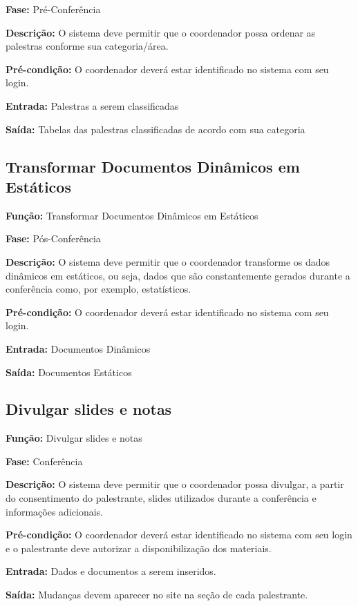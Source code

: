 \documentclass[letter]{article}
\begin{document}
\textbf{Fase:}  Pré-Conferência

\textbf{Descrição:}  O sistema deve permitir que o coordenador possa ordenar as palestras conforme sua categoria/área.

\textbf{Pré-condição:}  O coordenador deverá estar identificado no sistema com seu login.

\textbf{Entrada:}  Palestras a serem classificadas

\textbf{Saída:}  Tabelas das palestras classificadas de acordo com sua categoria



\subsection{Transformar Documentos Dinâmicos em Estáticos}

\textbf{Função:} Transformar Documentos Dinâmicos em Estáticos

\textbf{Fase:}  Pós-Conferência

\textbf{Descrição:}  O sistema deve permitir que o coordenador transforme os dados dinâmicos em estáticos, ou seja, dados que são constantemente gerados durante a conferência como, por exemplo, estatísticos.

\textbf{Pré-condição:}  O coordenador deverá estar identificado no sistema com seu login.

\textbf{Entrada:}  Documentos Dinâmicos

\textbf{Saída:}  Documentos Estáticos


\subsection{Divulgar slides e notas}

\textbf{Função:} Divulgar slides e notas

\textbf{Fase:}  Conferência

\textbf{Descrição:}  O sistema deve permitir que o coordenador possa divulgar, a partir do consentimento do palestrante, slides utilizados durante a conferência e informações adicionais.

\textbf{Pré-condição:}  O coordenador deverá estar identificado no sistema com seu login e o palestrante deve autorizar a disponibilização dos materiais.

\textbf{Entrada:}  Dados e documentos a serem inseridos.

\textbf{Saída:}  Mudanças devem aparecer no site na seção de cada palestrante.
\end{document}
